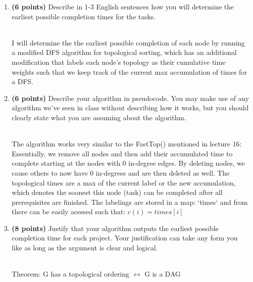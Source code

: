 \documentclass[11pt]{article}
\theoremstyle{definition}
\theoremstyle{theorem}
\newcommand{\solution}{\medskip\noindent{\color{DarkBlue}\textbf{Solution:}}}
\begin{document}
\begin{enumerate}[label=(\alph*)]
\item  \textbf{(6 points)} Describe in 1-3 English sentences how you will determine the earliest possible completion times for the tasks.

\solution \\ I will determine the the earliest possible completion of each node by running a modified DFS algorithm
for topological sorting, which has an additional modification that labels each node's topology as their cumulative time weights such that we keep track of the current max accumulation of times for a DFS.

\item  \textbf{(6 points)} Describe your algorithm in pseudocode.  You may make use of any algorithm we've seen in class without describing how it works, but you should clearly state what you are assuming about the algorithm.

\solution \\


The algorithm works very similar to the FastTop() mentioned in lecture 16:\\

Essentially, we remove all nodes and then add their accumulated time to complete starting at the nodes
with 0 in-degree edges. By deleting nodes, we cause others to now have 0 in-degrees and are then deleted as well. The topological times are 
a max of the current label or the new accumulation, which denotes the soonest this node (task) can be completed after all prerequisites are finished.
The labelings are stored in a map: `times` and from there can be easily acessed such that: $c(i) = times[i]$


\item   \textbf{(8 points)} Justify that your algorithm outputs the earliest possible completion time for each project.  Your justification can take any form you like as long as the argument is clear and logical.

\solution \\ 

Theorem: G has a topological ordering $\leftrightarrow$ G is a DAG\\


\end{enumerate}
\end{document}
